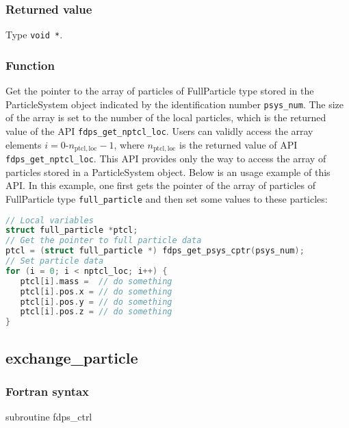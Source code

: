 \subsubsection*{Returned value}
Type \texttt{void *}.

\subsubsection*{Function}
Get the pointer to the array of particles of FullParticle type stored in the ParticleSystem object indicated by the identification number \texttt{psys\_num}. The size of the array is set to the number of the local particles, which is the returned value of the API \texttt{fdps\_get\_nptcl\_loc}. Users can validly access the array elements $i=0$-$n_{\mathrm{ptcl,loc}}-1$, where $n_{\mathrm{ptcl,loc}}$ is the returned value of API \texttt{fdps\_get\_nptcl\_loc}. This API provides only the way to access the array of particles stored in a ParticleSystem object. Below is an usage example of this API. In this example, one first gets the pointer of the array of particles of FullParticle type \texttt{full\_particle} and then set some values to these particles:
\begin{lstlisting}[language=C,caption=An usage example of API \texttt{fdps\_get\_psys\_cptr}]
// Local variables
struct full_particle *ptcl;
// Get the pointer to full particle data
ptcl = (struct full_particle *) fdps_get_psys_cptr(psys_num);
// Set particle data
for (i = 0; i < nptcl_loc; i++) {
   ptcl[i].mass =  // do something
   ptcl[i].pos.x = // do something
   ptcl[i].pos.y = // do something
   ptcl[i].pos.z = // do something
}
\end{lstlisting}

\clearpage

\subsection{exchange\_particle}
\subsubsection*{Fortran syntax}
\begin{screen}
\begin{spverbatim}
subroutine fdps_ctrl%
\end{spverbatim}
\end{screen}

